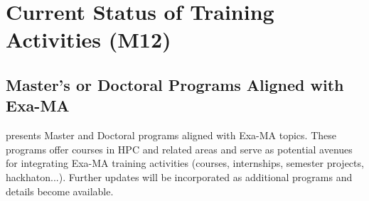 \section{Current Status of Training Activities (M12)}
\label{sec:current}

\subsection{Master's or Doctoral Programs Aligned with Exa-MA}
\label{sec:training-programs}

 presents Master and Doctoral programs aligned with Exa-MA topics.
These programs offer courses in HPC and related areas and serve as potential avenues for integrating Exa-MA training activities (courses, internships, semester projects, hackhaton...).
Further updates will be incorporated as additional programs and details become available.

